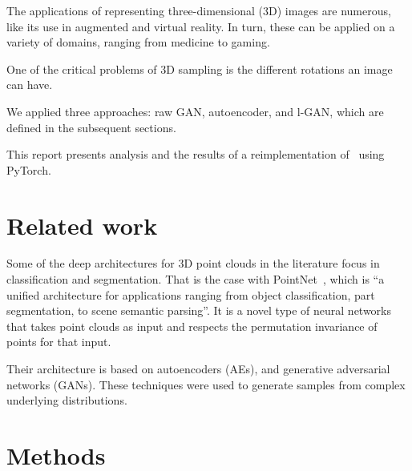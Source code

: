 \documentclass[12pt]{article}
\newcommand{\contentdescription}[1]{}
\begin{document}
    The applications of representing three-dimensional (3D) images are numerous, like its use in augmented and virtual reality.
    In turn, these can be applied on a variety of domains, ranging from medicine to gaming.

    One of the critical problems of 3D sampling is the different rotations an image can have.

    We applied three approaches: raw GAN, autoencoder, and l-GAN, which are defined in the subsequent sections.

    This report presents analysis and the results of a reimplementation of~\cite{pmlr-v80-achlioptas18a} using PyTorch.


    \section{Related work}
    \contentdescription{
        Related Work (5-15\%):
        Discuss the published work related to your project paper, the types of experiments you do and the additional method that you have added to this work or you have compared this paper with (if any).
    }


    Some of the deep architectures for 3D point clouds in the literature focus in classification and segmentation.
    That is the case with PointNet~\cite{arxiv:1612.00593},
    which is ``a unified architecture for applications ranging from object classification, part segmentation, to scene semantic parsing''.
    It is a novel type of neural networks that takes point clouds as input and respects the permutation invariance of points for that input.

    Their architecture is based on autoencoders (AEs)\cite{doi:10.5555/65669.104451}\cite{arxiv:1312.6114},
    and generative adversarial networks (GANs)\cite{NIPS2014_5ca3e9b1}\cite{arxiv:1511.06434}\cite{arxiv:1612.02136}.
    These techniques were used to generate samples from complex underlying distributions.


    \section{Methods}
    \contentdescription{
        Methods (15-25\%):
        Describe the original paper's method to the extent that you would need to make your report and findings understandable.
        Otherwise, here you can describe other methods that you compare with or other methods that you apply on top of what you reimplemented.
        Here, you also try to justify any methodical modification or incremental changes that you have added to the original paper.
        It may be helpful to include figures, diagrams, or tables to describe your method or compare it with other methods.
    }
\end{document}
